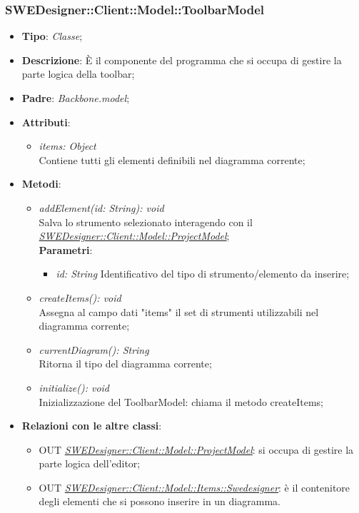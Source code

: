 \documentclass[../DefinizioneDiProdotto.tex]{subfiles}
\begin{document}
				\subsubsection{SWEDesigner::Client::Model::ToolbarModel}
				\hypertarget{SWEDesigner::Client::Model::ToolbarModel}{}
					\begin{itemize}
						\item \textbf{Tipo}: \emph{Classe};
						\item \textbf{Descrizione}: È il componente del programma che si occupa di gestire la parte logica della toolbar;
						\item \textbf{Padre}: \emph{Backbone.model};
						\item \textbf{Attributi}:
						\begin{itemize}
							\item \emph{items: Object} \\
							Contiene tutti gli elementi definibili nel diagramma corrente; \\
						\end{itemize}
						\item \textbf{Metodi}:
						\begin{itemize}
							\item \emph{addElement(id: String): void} \\
							Salva lo strumento selezionato interagendo con il \hyperlink{SWEDesigner::Client::Model::ProjectModel}{\emph{SWEDesigner::Client::Model::ProjectModel}}; \\
							\textbf{Parametri}:
							\begin{itemize}
								\item \emph{id: String}
								Identificativo del tipo di strumento/elemento da inserire; \\
							\end{itemize}
							\item \emph{createItems(): void} \\
							Assegna al campo dati "items" il set di strumenti utilizzabili nel diagramma corrente; \\
							\item \emph{currentDiagram(): String} \\
							Ritorna il tipo del diagramma corrente; \\
							\item \emph{initialize(): void} \\
							Inizializzazione del ToolbarModel: chiama il metodo createItems;
						\end{itemize}
						\item \textbf{Relazioni con le altre classi}:
						\begin{itemize}
							\item OUT \hyperlink{SWEDesigner::Client::Model::ProjectModel}{\emph{SWEDesigner::Client::Model::ProjectModel}}: si occupa di gestire la parte logica dell'editor;
							\item OUT \hyperlink{SWEDesigner::Client::Model::Items::Swedesigner}{\emph{SWEDesigner::Client::Model::Items::Swedesigner}}: è il contenitore degli elementi che si possono inserire in un diagramma.
						\end{itemize}
					\end{itemize}
\end{document}
